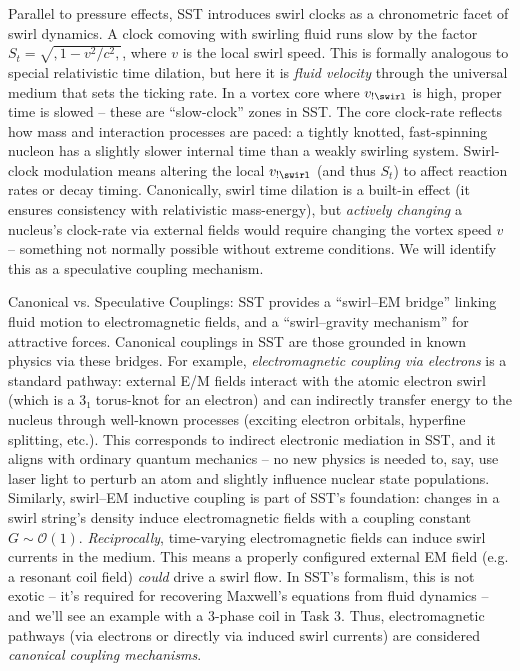 \documentclass[11pt]{article}
\begin{document}
Parallel to pressure effects, SST introduces swirl clocks as a chronometric facet of swirl dynamics. A clock comoving with swirling fluid runs slow by the factor $S_{t}=\sqrt{,1 - v^2/c^2,}$, where $v$ is the local swirl speed. This is formally analogous to special relativistic time dilation, but here it is \textit{fluid velocity} through the universal medium that sets the ticking rate. In a vortex core where $v_{!\swirl}$ is high, proper time is slowed – these are “slow-clock” zones in SST. The core clock-rate reflects how mass and interaction processes are paced: a tightly knotted, fast-spinning nucleon has a slightly slower internal time than a weakly swirling system. Swirl-clock modulation means altering the local $v_{!\swirl}$ (and thus $S_{t}$) to affect reaction rates or decay timing. Canonically, swirl time dilation is a built-in effect (it ensures consistency with relativistic mass-energy), but \textit{actively changing} a nucleus’s clock-rate via external fields would require changing the vortex speed $v$ – something not normally possible without extreme conditions. We will identify this as a speculative coupling mechanism.


Canonical vs. Speculative Couplings: SST provides a “swirl–EM bridge” linking fluid motion to electromagnetic fields, and a “swirl–gravity mechanism” for attractive forces. Canonical couplings in SST are those grounded in known physics via these bridges. For example, \textit{electromagnetic coupling via electrons} is a standard pathway: external E/M fields interact with the atomic electron swirl (which is a 3₁ torus-knot for an electron) and can indirectly transfer energy to the nucleus through well-known processes (exciting electron orbitals, hyperfine splitting, etc.). This corresponds to indirect electronic mediation in SST, and it aligns with ordinary quantum mechanics – no new physics is needed to, say, use laser light to perturb an atom and slightly influence nuclear state populations. Similarly, swirl–EM inductive coupling is part of SST’s foundation: changes in a swirl string’s density induce electromagnetic fields with a coupling constant $G\sim\mathcal{O}(1)$. \textit{Reciprocally}, time-varying electromagnetic fields can induce swirl currents in the medium. This means a properly configured external EM field (e.g. a resonant coil field) \textit{could} drive a swirl flow. In SST’s formalism, this is not exotic – it’s required for recovering Maxwell’s equations from fluid dynamics – and we’ll see an example with a 3-phase coil in Task 3. Thus, electromagnetic pathways (via electrons or directly via induced swirl currents) are considered \textit{canonical coupling mechanisms}.
\end{document}
